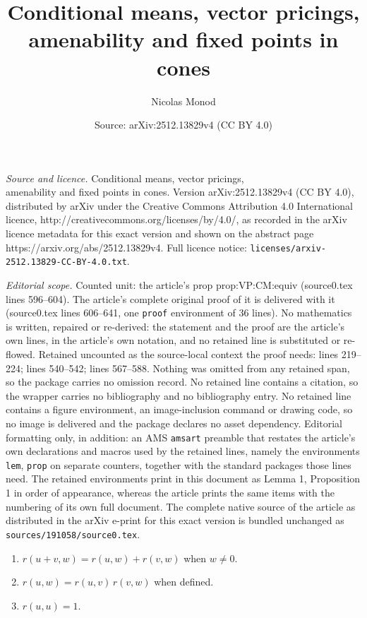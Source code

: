 \documentclass[10pt,a4paper]{amsart}
\title{Conditional means, vector pricings,\\ amenability and fixed points in cones}
\author{Nicolas Monod}
\date{Source: arXiv:2512.13829v4 (CC BY 4.0)}
\begin{document}
\maketitle

\noindent\emph{Source and licence.} Conditional means, vector pricings,\\ amenability and fixed points in cones. Version arXiv:2512.13829v4 (CC BY 4.0), distributed by arXiv under the Creative Commons Attribution 4.0 International licence, http://creativecommons.org/licenses/by/4.0/, as recorded in the arXiv licence metadata for this exact version and shown on the abstract page https://arxiv.org/abs/2512.13829v4. Full licence notice: \texttt{licenses/arxiv-2512.13829-CC-BY-4.0.txt}.\par\smallskip

\noindent\textit{Editorial scope.} Counted unit: the article's prop prop:VP:CM:equiv (source0.tex lines 596--604). The article's complete original proof of it is delivered with it (source0.tex lines 606--641, one \texttt{proof} environment of 36 lines). No mathematics is written, repaired or re-derived: the statement and the proof are the article's own lines, in the article's own notation, and no retained line is substituted or re-flowed.  Retained uncounted as the source-local context the proof needs: lines 219--224; lines 540--542; lines 567--588.  Nothing was omitted from any retained span, so the package carries no omission record.  No retained line contains a citation, so the wrapper carries no bibliography and no bibliography entry.  No retained line contains a figure environment, an image-inclusion command or drawing code, so no image is delivered and the package declares no asset dependency.  Editorial formatting only, in addition: an AMS \texttt{amsart} preamble that restates the article's own declarations and macros used by the retained lines, namely the environments \texttt{lem}, \texttt{prop} on separate counters, together with the standard packages those lines need.  The retained environments print in this document as Lemma 1, Proposition 1 in order of appearance, whereas the article prints the same items with the numbering of its own full document.  The complete native source of the article as distributed in the arXiv e-print for this exact version is bundled unchanged as \texttt{sources/191058/source0.tex}.
\smallskip
\begin{enumerate}[left=2\parindent, labelsep=\parindent, topsep=3pt, itemsep=3pt, label=\normalfont(VP\arabic*)]
\item $r(u+v, w) = r(u, w) + r(v, w)$ when $w\neq 0$. \label{pt:VP:add}
\item $ r(u,w) = r(u, v) \, r(v, w)$ when defined. \label{pt:VP:cocycle}
\item $r(u,u)=1$.\label{pt:VP:one}
\end{enumerate}
\end{document}

